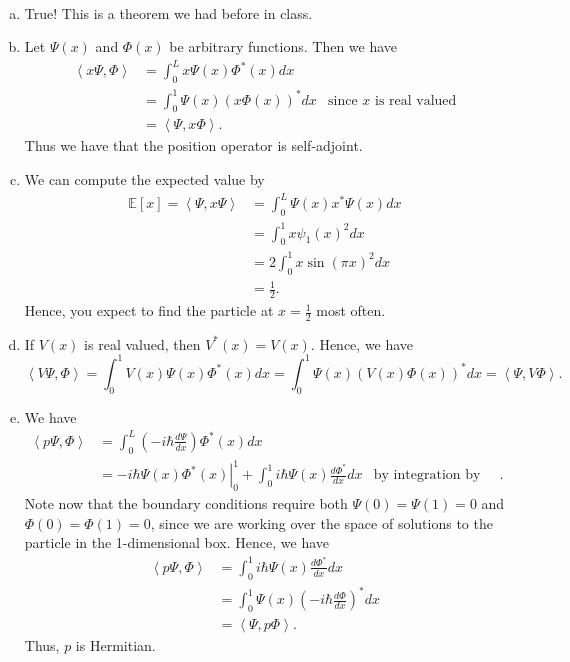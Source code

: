 \documentclass[12pt]{article} %
\newcommand{\innprod}[2]{\left\langle #1, #2\right\rangle}
\begin{document}
\begin{solution}~
	\begin{enumerate}[(a)]
		\item True! This is a theorem we had before in class.
		\item Let $\Psi(x)$ and $\Phi(x)$ be arbitrary functions.  Then we have
		\begin{align*}
			\innprod{x\Psi}{\Phi} &= \int_0^L x \Psi(x)\Phi^*(x)dx\\
			&= \int_0^1 \Psi(x) \left(x \Phi(x)\right)^*dx &\textrm{since $x$ is real valued}\\
			&= \innprod{\Psi}{x\Phi}.
		\end{align*}
		Thus we have that the position operator is self-adjoint.
		\item We can compute the expected value by
		\begin{align*}
			\mathbb{E}[x] = \innprod{\Psi}{x\Psi} &= \int_0^L \Psi(x) x^* \Psi(x)dx\\
			&= \int_0^1 x\psi_1(x)^2dx\\
			&= 2\int_0^1 x \sin(\pi x)^2 dx\\
			&= \frac{1}{2}.
		\end{align*}
		Hence, you expect to find the particle at $x=\frac{1}{2}$ most often.
        \item If $V(x)$ is real valued, then $V^*(x)=V(x)$.  Hence, we have
	\[
	\innprod{V\Psi}{\Phi} = \int_0^1 V(x)\Psi(x)\Phi^*(x)dx = \int_0^1 \Psi(x)\left(V(x)\Phi(x)\right)^*dx = \innprod{\Psi}{V\Phi}.
	\]
	\item We have
\begin{align*}
	\innprod{p \Psi}{\Phi} &= \int_0^L \left(-i\hbar \frac{d \Psi}{dx}\right)\Phi^*(x)dx\\
	&= \left.-i\hbar \Psi(x)\Phi^*(x)  \right\vert_0^1 + \int_0^1 i\hbar \Psi(x) \frac{d\Phi^*}{dx}dx & \textrm{by integration by parts}.
\end{align*}
Note now that the boundary conditions require both $\Psi(0)=\Psi(1)=0$ and $\Phi(0)=\Phi(1)=0$, since we are working over the space of solutions to the particle in the 1-dimensional box.  Hence, we have
\begin{align*}
	\innprod{p\Psi}{\Phi} &= \int_0^1 i\hbar \Psi(x) \frac{d\Phi^*}{dx}dx\\
	&= \int_0^1 \Psi(x)\left(-i\hbar \frac{d\Phi}{dx}\right)^* dx \\
	&= \innprod{\Psi}{p\Phi}.
\end{align*}
Thus, $p$ is Hermitian.


\end{enumerate}
\end{solution}
\end{document}
